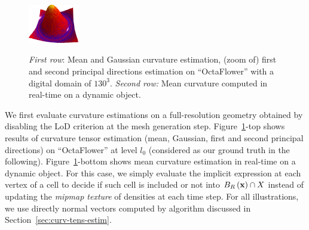 \documentclass{llncs}
\begin{document}
\begin{figure}
\begin{center}
    {\includegraphics[width=2.2cm]{figs/function_mean_4}}
  \end{center}
  \vspace{-0.35cm}
  \caption{\emph{First row}: Mean and Gaussian curvature estimation, (zoom of) first and second principal directions estimation on ``OctaFlower'' with a digital domain of $130^3$.
  \emph{Second row:} Mean curvature computed in real-time on a dynamic object.}
  \label{fig:full}
  \vspace{-0.35cm}
\end{figure}


We first evaluate curvature estimations on a full-resolution geometry
obtained by disabling the LoD criterion at the mesh generation step.
Figure~\ref{fig:full}-top shows results of curvature tensor estimation
(mean, Gaussian, first and second principal directions) on
``OctaFlower'' at level $l_0$ (considered as our ground truth in the
following).  Figure~\ref{fig:full}-bottom shows mean curvature
estimation in real-time on a dynamic object. For this case, we simply
evaluate the implicit expression at each vertex of a cell to decide if
such cell is included or not into $B_{R}\left(\mathbf{x}\right)\cap X$ instead
of updating the \emph{mipmap texture} of densities at each time
step. For all illustrations, we use directly normal vectors computed
by algorithm discussed in Section~\ref{sec:curv-tens-estim}.
\end{document}
